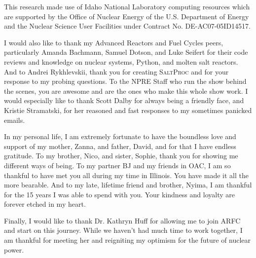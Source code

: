 \documentclass[edeposit,fullpage,hidelinks]{uiucthesis2018}
\newcommand{\SaltProc}{\textsc{SaltProc}\xspace}
\begin{document}
This research made use of Idaho National Laboratory computing resources which
are supported by the Office of Nuclear Energy of the U.S. Department of Energy
and the Nuclear Science User Facilities under Contract No. DE-AC07-05ID14517.

I would also like to thank my Advanced Reactors and Fuel Cycles peers,
particularly Amanda Bachmann, Samuel Dotson, and Luke Seifert for their code
reviews and knowledge on nuclear systems, Python, and molten salt reactors. And
to Andrei Rykhlevskii, thank you for creating \SaltProc and for your response to
my probing questions. To the NPRE Staff who run the show behind the scenes, you
are awesome and are the ones who make this whole show work. I would especially
like to thank Scott Dalby for always being a friendly face, and Kristie
Stramatski, for her reasoned and fast responses to my sometimes panicked emails.

In my personal life, I am extremely fortunate to have the boundless love and
support of my mother, Zanna, and father, David, and for that I have endless
gratitude. To my brother, Nico, and sister, Sophie, thank you for showing me
different ways of being. To my partner BJ and my friends in OAC, I am so
thankful to have met you all during my time in Illinois. You have made it all
the more bearable. And to my late, lifetime friend and brother, Nyima, I am
thankful for the 15 years I was able to spend with you. Your kindness and
loyalty are forever etched in my heart.

Finally, I would like to thank Dr. Kathryn Huff for allowing me to join ARFC and
start on this journey. While we haven't had much time to work together, I am
thankful for meeting her and reigniting my optimism for the future of nuclear
power.


\tableofcontents
\listoftables
\listoffigures
\end{document}
